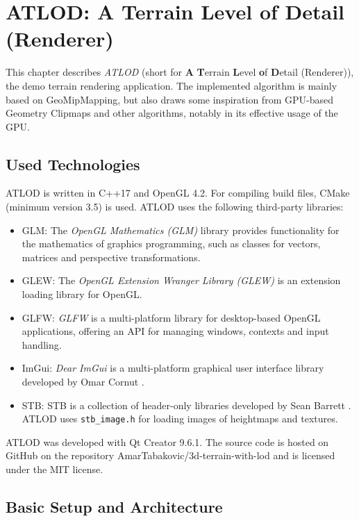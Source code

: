 \chapter{ATLOD: A Terrain Level of Detail (Renderer)}
This chapter describes \textit{ATLOD} (short for \textbf{A} \textbf{T}errain \textbf{L}evel \textbf{o}f \textbf{D}etail (Renderer)), the demo terrain rendering application.
The implemented algorithm is mainly based on GeoMipMapping, but also draws some inspiration from GPU-based Geometry Clipmaps and other algorithms,
notably in its effective usage of the GPU. 

\section{Used Technologies}
ATLOD is written in C++17 and OpenGL 4.2.
For compiling build files, CMake (minimum version 3.5) is used.
ATLOD uses the following third-party libraries:
\begin{itemize}
  \item GLM: The \textit{OpenGL Mathematics (GLM)} library provides functionality for the mathematics of graphics programming, such as classes for vectors, matrices and perspective transformations.
  \item GLEW: The \textit{OpenGL Extension Wranger Library (GLEW)} is an extension loading library for OpenGL. 
  \item GLFW: \textit{GLFW} is a multi-platform library for desktop-based OpenGL applications, offering an API for managing windows, contexts and input handling.
  \item ImGui: \textit{Dear ImGui} is a multi-platform graphical user interface library developed by Omar Cornut \cite{imgui}.
  \item STB: STB is a collection of header-only libraries developed by Sean Barrett \cite{stb}. ATLOD uses \texttt{stb\_image.h} for loading images of heightmaps and textures.
\end{itemize}

ATLOD was developed with Qt Creator 9.6.1. The source code is hosted on GitHub on the repository AmarTabakovic/3d-terrain-with-lod
and is licensed under the MIT license.

\section{Basic Setup and Architecture}
